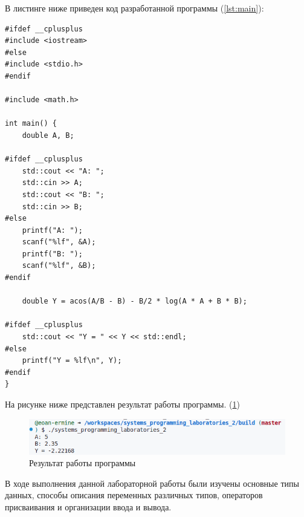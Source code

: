 \documentclass[14pt]{extarticle}
\makeatletter
\newenvironment{code}{\captionsetup{type=listing, belowskip=-14pt plus 3pt minus 0pt}}{}
\newcounter{sectionc} %
\newcommand{\nonumbersections}{\renewcommand{\Hy@numberline}[1]{}}
\let\oldsectionc\sectionc
\renewcommand{\sectionc}{\nonumbersections\oldsectionc}
\makeatother
\begin{document}
В листинге ниже приведен код разработанной программы (\ref{lst:main}):

\begin{code}    
\caption{Код программы\label{lst:main}}
\begin{verbatim}
#ifdef __cplusplus
#include <iostream>
#else
#include <stdio.h>
#endif

#include <math.h>

int main() {
    double A, B;

#ifdef __cplusplus
    std::cout << "A: ";
    std::cin >> A;
    std::cout << "B: ";
    std::cin >> B;
#else
    printf("A: ");
    scanf("%lf", &A);
    printf("B: ");
    scanf("%lf", &B);
#endif

    double Y = acos(A/B - B) - B/2 * log(A * A + B * B);

#ifdef __cplusplus
    std::cout << "Y = " << Y << std::endl;
#else
    printf("Y = %lf\n", Y);
#endif
}
\end{verbatim}
\end{code}

На рисунке ниже представлен результат работы программы. (\ref{img:res})

\begin{figure}[H]
    \centering
    \includegraphics[width=1.0\linewidth]{res.png}
    \caption{Результат работы программы\label{img:res}}
\end{figure}


В ходе выполнения данной лабораторной работы были изучены основные типы данных, способы описания переменных различных типов, операторов присваивания и организации ввода и вывода.
\end{document}

